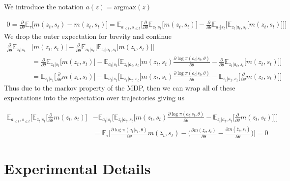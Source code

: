 \documentclass{article}
\newcommand{\E}{\mathbb{E}}
\newcommand{\LL}[1]{\frac{\partial \log \pi(a_{#1}| s_{#1}, \theta)}{\partial \theta}}
\newcommand{\PT}{\frac{\partial}{\partial \theta}}
\begin{document}
We introduce the notation $a(z) = \text{argmax}(z)$

\begin{align}
0 = \PT \E_\tau\Big[ m(z_t, s_t) - m(z_t, s_t) \Big] = \E_{a_{<t},s_{\leq t}}\Big[ \PT \E_{z_t|s_t} \Big[ m(z_t, s_t) \Big] -  \PT \E_{a_t|s_t} \Big[ \E_{z_t|a_t, s_t}\Big[ m(z_t, s_t)\Big] \Big]\Big]
\end{align}
We drop the outer expectation for brevity and continue
\begin{align}
\PT \E_{z_t|s_t} &\Big[ m(z_t, s_t) \Big] -  \PT \E_{a_t|s_t} \Big[ \E_{z_t|a_t, s_t}\Big[ m(z_t, s_t)\Big] \Big]\\
&= \PT \E_{z_t|s_t} \Big[ m(z_t, s_t) \Big] - \E_{a_t|s_t} \Big[ \E_{z_t|a_t, s_t}\Big[m(z_t, s_t) \LL{t} -\PT \E_{z_t|a_t, s_t}\Big[m(z_t, s_t)  \Big] \Big]\\
&= \E_{z_t|s_t} \Big[ \PT m(z_t, s_t) \Big] - \E_{a_t|s_t} \Big[ \E_{z_t|a_t, s_t}\Big[m(z_t, s_t) \LL{t} - \E_{z_t|a_t, s_t}\Big[\PT m(z_t, s_t)  \Big] \Big]
\end{align}
Thus due to the markov property of the MDP, then we can wrap all of these expectations into the expectation over trajectories giving us

\begin{align}
\E_{a_{<t},s_{\leq t}}\Big[\E_{z_t|s_t} \Big[ \PT m(z_t, s_t) \Big] &- \E_{a_t|s_t} \Big[ \E_{z_t|a_t, s_t}\Big[m(z_t, s_t) \LL{t} - \E_{z_t|a_t, s_t}\Big[\PT m(z_t, s_t)  \Big] \Big]\Big]\\
&= \E_\tau\Big[ \LL{t} m(\tilde{z_t}, s_t) - \Big(\frac{\partial m(z_t, s_t)}{\partial\theta} - \frac{\partial m(\tilde{z_t}, s_t)}{\partial\theta}\Big)\Big] = 0
\end{align}




\section{Experimental Details}
\label{experiment appendix}
\end{document}
